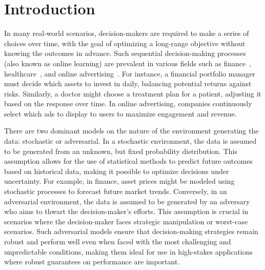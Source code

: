 \section{Introduction} 
\label{sec:intro}

In many real-world scenarios, decision-makers are required to make a series of choices over time, with the goal of optimizing a long-range objective without knowing the outcomes in advance. Such sequential decision-making processes (also known as online learning) are prevalent in various fields such as finance~\citep{bell1988game, ban2018machine}, healthcare~\citep{bastani2021efficient, killian2023robust}, and online advertising~\citep{wagner2019digital, choi2020online}. For instance, a financial portfolio manager must decide which assets to invest in daily, balancing potential returns against risks. Similarly, a doctor might choose a treatment plan for a patient, adjusting it based on the response over time. In online advertising, companies continuously select which ads to display to users to maximize engagement and revenue.

There are two dominant models on the nature of the environment generating the data: stochastic or adversarial. In a stochastic environment, the data is assumed to be generated from an unknown, but fixed probability distribution. This assumption allows for the use of statistical methods to predict future outcomes based on historical data, making it possible to optimize decisions under uncertainty. For example, in finance, asset prices might be modeled using stochastic processes to forecast future market trends. Conversely, in an adversarial environment, the data is assumed to be generated by an adversary who aims to thwart the decision-maker’s efforts. This assumption is crucial in scenarios where the decision-maker faces strategic manipulation or worst-case scenarios. Such adversarial models ensure that decision-making strategies remain robust and perform well even when faced with the most challenging and unpredictable conditions, making them ideal for use in high-stakes applications where robust guarantees on performance are important.

